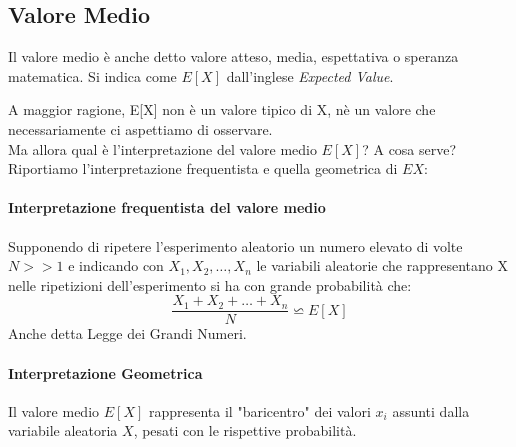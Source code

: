 \subsection{Valore Medio}
Il valore medio è anche detto valore atteso, media, espettativa o speranza matematica.
Si indica come $E[X]$ dall'inglese \emph{Expected Value}.


A maggior ragione, E[X] non è un valore tipico di X, nè un valore che necessariamente
ci aspettiamo di osservare.
\\ Ma allora qual è l'interpretazione del valore medio $E[X]$? A cosa serve?
Riportiamo l'interpretazione frequentista e quella geometrica di $E{X}$:
\paragraph{Interpretazione frequentista del valore medio}
Supponendo di ripetere l'esperimento aleatorio un numero elevato di volte $N >> 1$
e indicando con $X_1, X_2, \dots, X_n$ le variabili aleatorie che rappresentano X nelle
ripetizioni dell'esperimento si ha con grande probabilità che:
\[
    \frac{X_1 + X_2 + \dots + X_n}{N} \backsimeq  E[X]
\]
Anche detta Legge dei Grandi Numeri.

\paragraph{Interpretazione Geometrica}
Il valore medio $E[X]$ rappresenta il "baricentro" dei valori $x_i$ assunti dalla variabile aleatoria $X$, pesati
con le rispettive probabilità.

